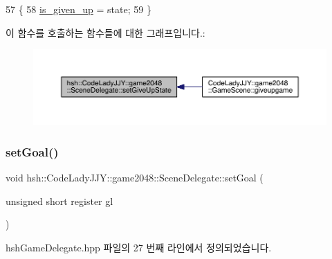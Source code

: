 \begin{DoxyCode}
57                                                \{
58                     \hyperlink{classhsh_1_1_code_lady_j_j_y_1_1game2048_1_1_scene_delegate_a8ea6710e5c00d1af16c4566260c62501}{is\_given\_up} = state;
59                 \}
\end{DoxyCode}
이 함수를 호출하는 함수들에 대한 그래프입니다.\+:
\nopagebreak
\begin{figure}[H]
\begin{center}
\leavevmode
\includegraphics[width=350pt]{d7/d4d/classhsh_1_1_code_lady_j_j_y_1_1game2048_1_1_scene_delegate_a26d362200e9644c85f892e71592eef92_icgraph}
\end{center}
\end{figure}
\mbox{\label{classhsh_1_1_code_lady_j_j_y_1_1game2048_1_1_scene_delegate_af6805111081144b68d039d8f71d1ed0b}} 
\subsubsection{\texorpdfstring{set\+Goal()}{setGoal()}}
{\footnotesize\ttfamily void hsh\+::\+Code\+Lady\+J\+J\+Y\+::game2048\+::\+Scene\+Delegate\+::set\+Goal (\begin{DoxyParamCaption}\item[{unsigned short register}]{gl }\end{DoxyParamCaption})\hspace{0.3cm}{\ttfamily [inline]}}



hsh\+Game\+Delegate.\+hpp 파일의 27 번째 라인에서 정의되었습니다.



